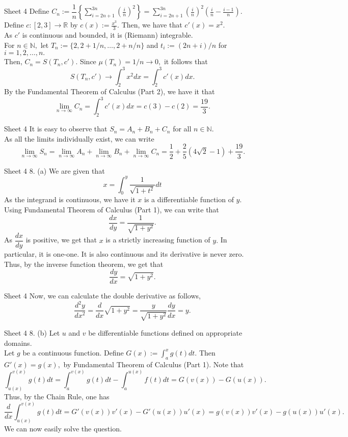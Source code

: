 \documentclass[handout, aspectratio=169]{beamer}
\begin{document}
\begin{frame}{Sheet 4}
	Define $C_n := \displaystyle\dfrac{1}{n}\left\{\sum_{i=2n+1}^{3n}\left(\frac{i}{n}\right)^{2}\right\} =\sum_{i=2n+1}^{3n}\left(\frac{i}{n}\right)^{2}\left(\frac{i}{n} - \frac{i-1}{n}\right).$\\
	Define $c:[2, 3] \to \mathbb{R}$ by $c(x) := \frac{x^3}{3}.$ Then, we have that $c'(x) = x^{2}.$\\
	As $c'$ is continuous and bounded, it is (Riemann) integrable. \\
	For $n \in \mathbb{N},$ let $T_n := \{2, 2+1/n, \ldots, 2+n/n\}$ and $t_i := (2n+i)/n$ for $i = 1, 2, \ldots, n.$\\
	Then, $C_n = S(T_n, c').$ Since $\mu(T_n) = 1/n \to 0,$ it follows that
	\[S(T_n, c') \to \int_{2}^{3} x^{2} dx = \int_{2}^{3} c'(x) dx. \]
	By the Fundamental Theorem of Calculus (Part 2), we have it that
	\[\lim_{n\to \infty}C_n = \int_{2}^{3} c'(x) dx = c(3) - c(2) = \dfrac{19}{3}.\]
\end{frame}
\begin{frame}{Sheet 4}
	It is easy to observe that $S_n = A_n + B_n + C_n$ for all $n \in \mathbb{N}.$\\
	As all the limits individually exist, we can write
	\[\lim_{n\to \infty}S_n = \lim_{n\to \infty}A_n + \lim_{n\to \infty}B_n + \lim_{n\to \infty}C_n = \dfrac{1}{2} + \dfrac{2}{5}(4\sqrt{2} - 1) + \dfrac{19}{3}.\]
\end{frame}
\begin{frame}{Sheet 4}
	8. (a) We are given that
	\[x = \int_{0}^{y} \frac{1}{\sqrt{1 + t^2}} dt \]
	As the integrand is continuous, we have it $x$ is a differentiable function of $y.$ Using Fundamental Theorem of Calculus (Part 1), we can write that
	\[\frac{dx}{dy} = \frac{1}{\sqrt{1 + y^2}}.\]
	As $\dfrac{dx}{dy}$ is positive, we get that $x$ is a strictly increasing function of $y.$ In particular, it is one-one. It is also continuous and its derivative is never zero. Thus, by the inverse function theorem, we get that
	\[\frac{dy}{dx} = \sqrt{1 + y^2}.\]
\end{frame}
	
\begin{frame}{Sheet 4}
	Now, we can calculate the double derivative as follows,
	\[\frac{d^2y}{dx^2} = \frac{d}{dx}\sqrt{1 + y^2} = \dfrac{y}{\sqrt{1 + y^2}}\dfrac{dy}{dx} = y.\]
\end{frame}
\begin{frame}{Sheet 4}
	8. (b) Let $u$ and $v$ be differentiable functions defined on appropriate domains.\\
	Let $g$ be a continuous function. Define $G(x) := \displaystyle\int_{a}^{x} g(t) dt.$ Then $G'(x) = g(x),$ by Fundamental Theorem of Calculus (Part 1). Note that
	\[\int_{u(x)}^{v(x)} g(t) dt = \int_{a}^{v(x)} g(t) dt - \int_{a}^{u(x)} f(t) dt = G(v(x)) - G(u(x)).\]
	Thus, by the Chain Rule, one has
	\[\dfrac{d}{dx}\int_{u(x)}^{v(x)} g(t) dt = G'(v(x))v'(x) - G'(u(x))u'(x) = g(v(x))v'(x) - g(u(x))u'(x).\]
	We can now easily solve the question.
\end{frame}
	
\end{document}
